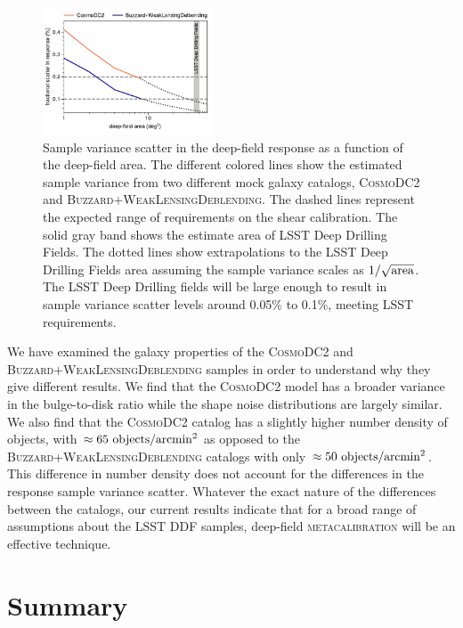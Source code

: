 \documentclass[twocolumn]{openjournal}
\makeatletter
\newcommand{\mcal}{\textsc{metacalibration}\@\xspace}
\newcommand{\descwl}{\textsc{WeakLensingDeblending}\@\xspace}
\newcommand{\cosmodctwo}{\textsc{CosmoDC2}\@\xspace}
\newcommand{\buzzard}{\textsc{Buzzard}\@\xspace}
\makeatother
\begin{document}
\begin{figure}
    \centering
    \includegraphics[width=0.45\textwidth]{sample_var.pdf}
    \caption{
      Sample variance scatter in the deep-field response as a function of the
      deep-field area. The different colored lines show the estimated sample variance
      from two different mock galaxy catalogs, \cosmodctwo and \buzzard+\descwl. The
      dashed lines represent the expected range of requirements on the shear
      calibration. The solid gray band shows the estimate area of LSST Deep Drilling
      Fields. The dotted lines show extrapolations to the LSST Deep Drilling Fields
      area assuming the sample variance scales as $1/\sqrt{\rm area}$. The LSST Deep
      Drilling fields will be large enough to result in sample variance scatter levels
      around 0.05\% to 0.1\%, meeting LSST requirements.
    }
    \label{fig:sample_variance}
\end{figure}

We have examined the galaxy properties of the \cosmodctwo and \buzzard+\descwl samples
in order to understand why they give different results. We find that the \cosmodctwo
model has a broader variance in the bulge-to-disk ratio while the shape noise
distributions are largely similar. We also find that the \cosmodctwo catalog has a
slightly higher number density of objects, with $\approx65\ {\rm objects}/{\rm
arcmin}^2$ as opposed to the \buzzard+\descwl catalogs with only $\approx50\ {\rm
objects}/{\rm arcmin}^2$. This difference in number density does not account for the
differences in the response sample variance scatter. Whatever the exact nature of
the differences between the catalogs, our current results indicate that for a broad
range of assumptions about the LSST DDF samples, deep-field \mcal will be an effective
technique.


\section{Summary}\label{sec:conc}
\end{document}
